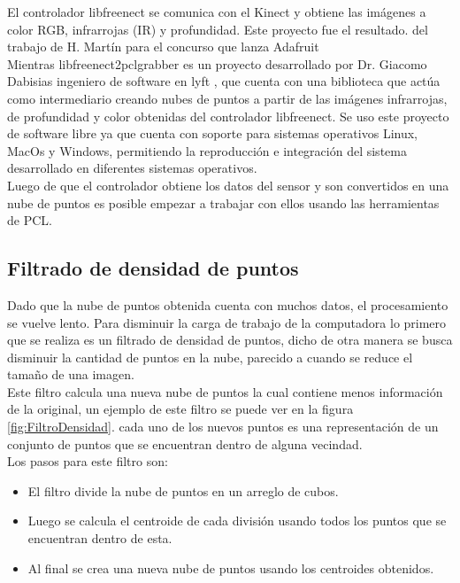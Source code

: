         El \gls{controlador} libfreenect \cite{libfreenect} se comunica con el Kinect y obtiene las imágenes a color RGB, infrarrojas (IR) y profundidad. Este proyecto fue el resultado. del trabajo de H. Martín para el concurso que
        lanza Adafruit \cite{UsodelKi56:online} \\ 
        
        
       
        
        Mientras libfreenect2pclgrabber \cite{k2g} es un proyecto desarrollado por  Dr. Giacomo Dabisias ingeniero de software en lyft \cite{k2g},  que cuenta con una biblioteca que actúa como intermediario creando nubes de puntos a partir de las imágenes  infrarrojas, de profundidad y color obtenidas del controlador libfreenect. Se uso este proyecto de software libre ya que cuenta con soporte para sistemas operativos Linux, MacOs y Windows, permitiendo la reproducción e integración del sistema desarrollado en diferentes sistemas operativos.  \\ 
        
        Luego de que el controlador obtiene los datos del sensor y son convertidos en una nube de puntos es posible empezar a trabajar con ellos usando las herramientas de PCL.\\
    
    \subsection{Filtrado de densidad de puntos}
    
        Dado que la nube de puntos obtenida cuenta con muchos datos, el procesamiento se vuelve lento. Para disminuir la carga de trabajo de la computadora lo primero que se realiza es un filtrado de densidad de puntos, dicho de otra manera se busca disminuir la cantidad de puntos en la nube, parecido a cuando se reduce el tamaño de una imagen.\\
        
        Este \gls{filtro} calcula una nueva nube de puntos la cual contiene menos información de la original, un ejemplo de este filtro se puede ver en la figura \ref{fig:FiltroDensidad}. cada uno de los nuevos puntos es una representación de un conjunto de puntos que se encuentran dentro de alguna vecindad.\\
        
        Los pasos para este filtro son:
        \begin{itemize}
            \item El filtro divide la nube de puntos en un arreglo de cubos.
            \item Luego se calcula el centroide de cada división usando todos los puntos que se encuentran dentro de esta.
            \item Al final se crea una nueva nube de puntos usando los centroides obtenidos.
        \end{itemize}
        
